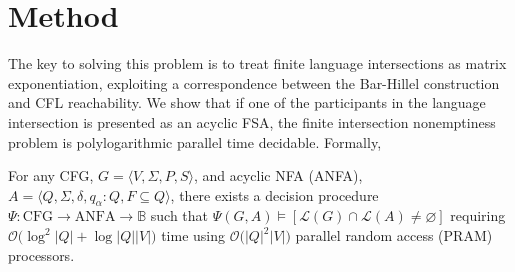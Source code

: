\documentclass[sigplan,review,acmsmall,nonacm,screen,anonymous]{acmart}\settopmatter{printfolios=false,printccs=false,printacmref=false}
\begin{document}

\clearpage\section{Method}\label{sec:method}

The key to solving this problem is to treat finite language intersections as matrix exponentiation, exploiting a correspondence between the Bar-Hillel construction and CFL reachability. We show that if one of the participants in the language intersection is presented as an acyclic FSA, the finite intersection nonemptiness problem is polylogarithmic parallel time decidable. Formally,

\begin{theorem}\label{thm:parallel_decision_complexity}
  For any CFG, $G = \langle V, \Sigma, P, S\rangle$, and acyclic NFA (ANFA), $A = \langle Q, \Sigma, \delta, q_\alpha: Q, F \subseteq Q\rangle$, there exists a decision procedure $\Psi: \text{CFG} \rightarrow \text{ANFA} \rightarrow \mathbb{B}$ such that $\Psi(G, A) \models [\mathcal{L}(G)\cap\mathcal{L}(A) \neq \varnothing]$ requiring $\mathcal{O}\big(\log^2|Q|+\log|Q||V|\big)$ time using $\mathcal{O}\big(|Q|^2|V|\big)$ parallel random access (PRAM) processors.
\end{theorem}
\end{document}
